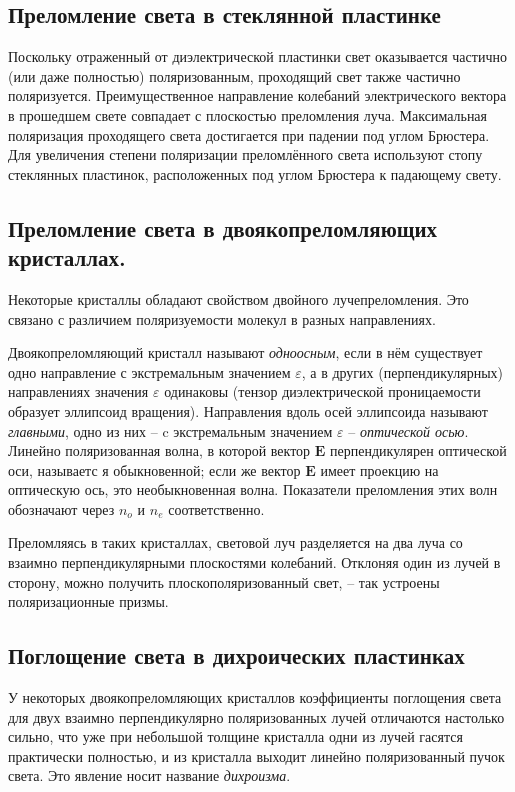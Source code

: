 \documentclass[a4paper,12pt]{article}
\begin{document}
\subsection{Преломление света в стеклянной пластинке}
Поскольку отраженный от диэлектрической пластинки свет оказывается частично (или даже полностью) поляризованным, проходящий свет также частично поляризуется. Преимущественное направление колебаний электрического вектора в прошедшем свете совпадает с плоскостью преломления луча. Максимальная поляризация проходящего света достигается при падении под углом Брюстера. Для увеличения степени поляризации преломлённого света используют стопу стеклянных пластинок, расположенных под углом Брюстера к падающему свету.

\subsection{Преломление света в двоякопреломляющих кристаллах.}
Некоторые кристаллы обладают свойством двойного лучепреломления. Это связано
с различием поляризуемости молекул в разных направлениях.

Двоякопреломляющий кристалл называют \textit{одноосным}, если в нём существует одно направление с экстремальным значением $\varepsilon$, а в других (перпендикулярных) направлениях значения $\varepsilon$ одинаковы (тензор диэлектрической проницаемости образует эллипсоид вращения). Направления вдоль осей эллипсоида называют \textit{главными}, одно из них -- c экстремальным значением $\varepsilon$ -- \textit{оптической осью}. Линейно поляризованная волна, в которой вектор $\mathbf{E}$ перпендикулярен оптической оси, называетс я обыкновенной; если же вектор $\mathbf{E}$ имеет проекцию на оптическую ось, это необыкновенная волна. Показатели преломления этих волн обозначают через $n_o$ и $n_e$ соответственно.

Преломляясь в таких кристаллах, световой луч разделяется на два
луча со взаимно перпендикулярными плоскостями колебаний. Отклоняя один из лучей в сторону, можно получить плоскополяризованный свет, -- так устроены поляризационные призмы.

\subsection{Поглощение света в дихроических пластинках}
У некоторых двоякопреломляющих кристаллов коэффициенты поглощения света для двух взаимно перпендикулярно поляризованных лучей отличаются настолько сильно, что уже при небольшой толщине кристалла одни из лучей гасятся практически полностью, и из кристалла выходит линейно поляризованный пучок света. Это явление носит название
\textit{дихроизма}. 
\end{document}
